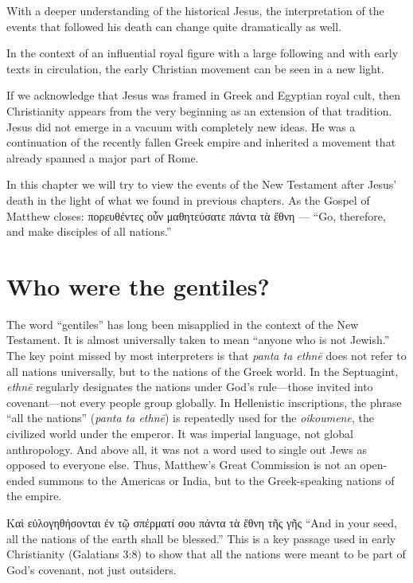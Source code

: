 With a deeper understanding of the historical Jesus, the interpretation of the events that followed his death can change quite dramatically as well.

In the context of an influential royal figure with a large following and with early texts in circulation, the early Christian movement can be seen in a new light.

If we acknowledge that Jesus was framed in Greek and Egyptian royal cult, then Christianity appears from the very beginning as an extension of that tradition.
Jesus did not emerge in a vacuum with completely new ideas.
He was a continuation of the recently fallen Greek empire and inherited a movement that already spanned a major part of Rome.

In this chapter we will try to view the events of the New Testament after Jesus’ death in the light of what we found in previous chapters.
As the Gospel of Matthew closes: πορευθέντες οὖν μαθητεύσατε πάντα τὰ ἔθνη — “Go, therefore, and make disciples of all nations.”

\section{Who were the gentiles?}\label{sec:who-were-the-gentiles}

The word “gentiles” has long been misapplied in the context of the New Testament.
It is almost universally taken to mean “anyone who is not Jewish.”
The key point missed by most interpreters is that \textit{panta ta ethnē} does not refer to all nations universally, but to the nations of the Greek world.
In the Septuagint, \textit{ethnē} regularly designates the nations under God’s rule—those invited into covenant—not every people group globally.
In Hellenistic inscriptions, the phrase “all the nations” (\textit{panta ta ethnē}) is repeatedly used for the \textit{oikoumene}, the civilized world under the emperor.
It was imperial language, not global anthropology.
And above all, it was not a word used to single out Jews as opposed to everyone else.
Thus, Matthew’s Great Commission is not an open-ended summons to the Americas or India, but to the Greek-speaking nations of the empire.

Καὶ εὐλογηθήσονται ἐν τῷ σπέρματί σου πάντα τὰ ἔθνη τῆς γῆς ``And in your seed, all the nations of the earth shall be blessed.''
This is a key passage used in early Christianity (Galatians 3:8) to show that all the nations were meant to be part of God's covenant, not just outsiders.

